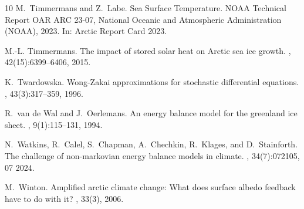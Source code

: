 \documentclass[10pt]{amsart}
\numberwithin{equation}{section}
\begin{document}
\begin{thebibliography}{10}
M.~Timmermans and Z.~Labe.
\newblock Sea {S}urface {T}emperature.
\newblock NOAA Technical Report OAR ARC 23-07, National Oceanic and Atmospheric
  Administration (NOAA), 2023.
\newblock In: Arctic Report Card 2023.

M.-L. Timmermans.
\newblock The impact of stored solar heat on {A}rctic sea ice growth.
, 42(15):6399--6406, 2015.

K.~Twardowska.
\newblock Wong-{Z}akai approximations for stochastic differential equations.
, 43(3):317--359, 1996.

R.~{van de Wal} and J.~Oerlemans.
\newblock An energy balance model for the greenland ice sheet.
, 9(1):115--131, 1994.

N.~Watkins, R.~Calel, S.~Chapman, A.~Chechkin, R.~Klages, and D.~Stainforth.
\newblock The challenge of non-markovian energy balance models in climate.
,
  34(7):072105, 07 2024.

M.~Winton.
\newblock Amplified arctic climate change: What does surface albedo feedback
  have to do with it?
, 33(3), 2006.

\end{thebibliography}
\end{document}
